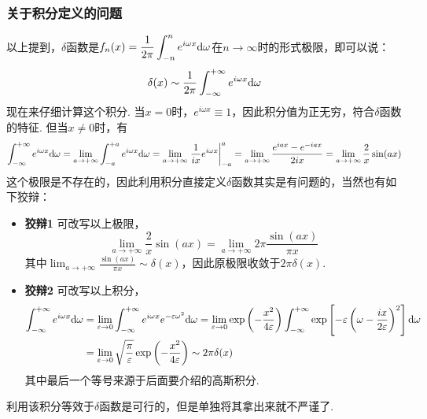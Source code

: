 \subsubsection{关于积分定义的问题}

以上提到，\(\delta\)函数是\(\displaystyle{f_n(x) = \frac{1}{2\pi}\int_{-n}^{n}e^{i\omega x}{\rm d}\omega}\)在\(n \to \infty\)时的形式极限，即可以说：
\[\delta(x) \sim \frac{1}{2\pi}\int_{-\infty}^{+\infty}e^{i\omega x}{\rm d}\omega\]
现在来仔细计算这个积分. 当\(x=0\)时，\(e^{i\omega x} \equiv 1\)，因此积分值为正无穷，符合\(\delta\)函数的特征. 但当\(x \neq 0\)时，有
\[\int_{-\infty}^{+\infty}e^{i\omega x}{\rm d}\omega = \lim_{a \to +\infty} \int_{-a}^{+a}e^{i\omega x}{\rm d}\omega = \lim_{a \to +\infty}\left.\frac{1}{ix}e^{i\omega x}\right|_{-a}^{a} = \lim_{a \to +\infty}\frac{e^{iax}-e^{-iax}}{2ix} = \lim_{a \to +\infty}\frac{2}{x}\sin(ax)\]
这个极限是不存在的，因此利用积分直接定义\(\delta\)函数其实是有问题的，当然也有如下狡辩：
\begin{itemize}
    \item [\(\bullet\)] \textbf{狡辩1} 可改写以上极限，
    \[\lim_{a \to +\infty}\frac{2}{x}\sin(ax) = \lim_{a \to +\infty}2\pi \frac{\sin(ax)}{\pi x}\] 
    其中\(\displaystyle{\lim_{a \to +\infty}\frac{\sin(ax)}{\pi x} \sim \delta(x)}\)，因此原极限收敛于\(2\pi\delta(x)\).
    \item[\(\bullet\)] \textbf{狡辩2} 可改写以上积分，
    \begin{align*}
        \int_{-\infty}^{+\infty}e^{i\omega x}{\rm d}\omega &= \lim_{\varepsilon \to 0}\int_{-\infty}^{+\infty}e^{i\omega x}e^{-\varepsilon\omega^2}{\rm d}\omega = \lim_{\varepsilon \to 0}\exp\left(-\frac{x^2}{4\varepsilon}\right)\int_{-\infty}^{+\infty}\exp\left[-\varepsilon\left(\omega-\frac{ix}{2\varepsilon}\right)^2\right]{\rm d}\omega \\
        &= \lim_{\varepsilon \to 0}\sqrt{\frac{\pi}{\varepsilon}}\exp\left(-\frac{x^2}{4\varepsilon}\right) \sim 2\pi \delta(x)
    \end{align*}
    其中最后一个等号来源于后面要介绍的高斯积分.
\end{itemize}

利用该积分等效于\(\delta\)函数是可行的，但是单独将其拿出来就不严谨了. 

